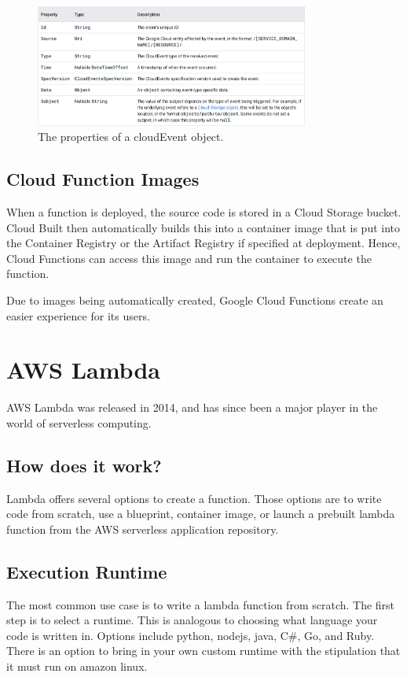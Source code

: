 \documentclass[10pt, conference]{IEEEtran}
\begin{document}
\begin{figure}[htbp]
\centerline{\includegraphics[width=9cm]{cloudEvent.PNG}}
\caption{The properties of a cloudEvent object.}
\label{fig}
\end{figure}

\subsection{Cloud Function Images }

When a function is deployed, the source code is stored in a Cloud Storage bucket. Cloud Built then automatically builds this into a container image that is put into the Container Registry or the Artifact Registry if specified at deployment. Hence, Cloud Functions can access this image and run the container to execute the function. 

Due to images being automatically created, Google Cloud Functions create an easier experience for its users. 

\section{ AWS Lambda}
AWS Lambda was released in 2014, and has since been a major player in the world of serverless computing. 
\subsection{How does it work?}

Lambda offers several options to create a function. Those options are to write code from scratch, use a blueprint, container image, or launch a prebuilt lambda function from the AWS serverless application repository.

\subsection{Execution Runtime}

The most common use case is to write a lambda function from scratch. The first step is to select a runtime. This is analogous to choosing what language your code is written in. Options include python, nodejs, java, C\#, Go, and Ruby. There is an option to bring in your own custom runtime with the stipulation that it must run on amazon linux.
\end{document}

